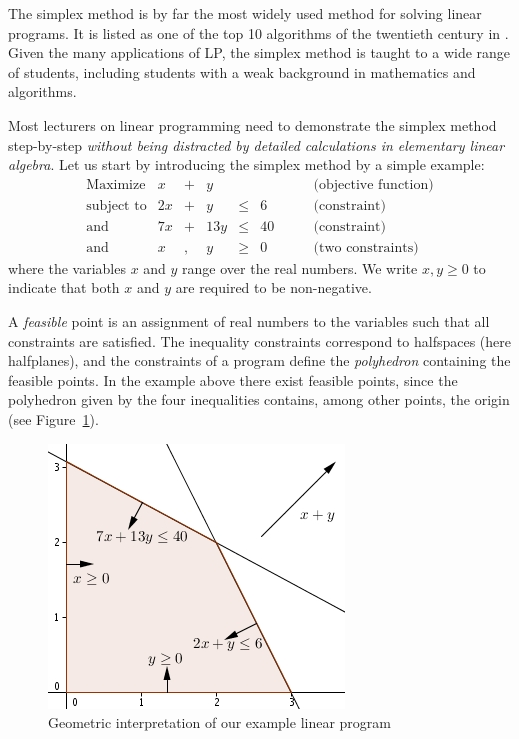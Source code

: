 \documentclass[ukenglish,a4]{article}
\begin{document}
The simplex method is by far the most widely used method for solving linear programs. 
It is listed as one of the top 10 algorithms of the twentieth century in
\cite{CiSaE2000}. Given the many applications of LP, the simplex method is taught to a wide range of
students, including students with a weak background in mathematics and algorithms. 

Most lecturers on linear programming need to demonstrate the simplex method step-by-step 
\emph{without being distracted by detailed calculations in elementary linear algebra}. Let us start by
introducing the simplex method by a simple example:
\[
    \begin{array}{lrcrcrl}
			\text{Maximize}  &    x &+&    y &	&	& \quad\quad \text{(objective function)}\\
			\text{subject to}&  2 x &+&    y &\leq&   6	& \quad\quad \text{(constraint)}\\
    	\text{and}&         7 x &+& 13 y &\leq&  40 & \quad\quad \text{(constraint)}\\
    	\text{and}       &    x &,&    y &\geq&0    &\quad\quad \text{(two constraints)}
    \end{array}
\]
where the variables $x$ and $y$ range over the real numbers. We write $x,y \geq 0$ to indicate that both $x$ and $y$ are required to be non-negative.

A \emph{feasible} point is an assignment of real numbers to the variables 
such that all constraints are satisfied. 
The inequality constraints correspond to halfspaces (here halfplanes), and the constraints of a program 
define the \emph{polyhedron} containing the feasible points.
In the example above there exist feasible points,
since the polyhedron given by the four inequalities contains,
among other points, the origin  (see Figure~\ref{fig:ex1}). 

\begin{figure}[htb]
	\begin{center}
		\includegraphics{ex1.jpg}
	\end{center}
	\caption{Geometric interpretation of our example linear program}
	\label{fig:ex1}
\end{figure}
\end{document}
